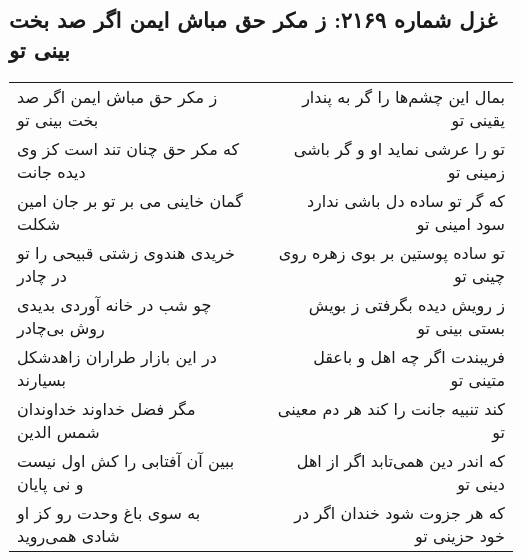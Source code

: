 \begin{center}
\section*{غزل شماره ۲۱۶۹: ز مکر حق مباش ایمن اگر صد بخت بینی تو}
\label{sec:2169}
\begin{longtable}{l p{0.5cm} r}
ز مکر حق مباش ایمن اگر صد بخت بینی تو
&&
بمال این چشم‌ها را گر به پندار یقینی تو
\\
که مکر حق چنان تند است کز وی دیده جانت
&&
تو را عرشی نماید او و گر باشی زمینی تو
\\
گمان خاینی می بر تو بر جان امین شکلت
&&
که گر تو ساده دل باشی ندارد سود امینی تو
\\
خریدی هندوی زشتی قبیحی را تو در چادر
&&
تو ساده پوستین بر بوی زهره روی چینی تو
\\
چو شب در خانه آوردی بدیدی روش بی‌چادر
&&
ز رویش دیده بگرفتی ز بویش بستی بینی تو
\\
در این بازار طراران زاهدشکل بسیارند
&&
فریبندت اگر چه اهل و باعقل متینی تو
\\
مگر فضل خداوند خداوندان شمس الدین
&&
کند تنبیه جانت را کند هر دم معینی تو
\\
ببین آن آفتابی را کش اول نیست و نی پایان
&&
که اندر دین همی‌تابد اگر از اهل دینی تو
\\
به سوی باغ وحدت رو کز او شادی همی‌روید
&&
که هر جزوت شود خندان اگر در خود حزینی تو
\\
\end{longtable}
\end{center}
